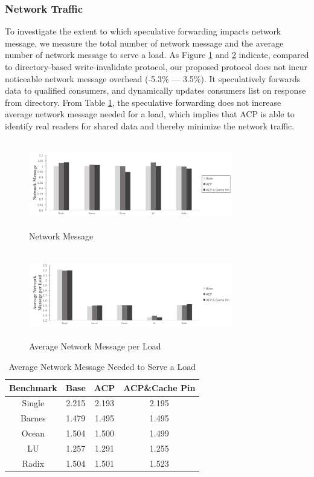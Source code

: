 \documentclass[conference]{IEEEtran}
\begin{document}
\subsubsection{Network Traffic}
To investigate the extent to which speculative forwarding impacts network message, we measure the total number of network message and the average number of network message to serve a load. As Figure \ref{network_msg} and \ref{avg_network_msg_per_load} indicate, compared to directory-based write-invalidate protocol, our proposed protocol does not incur noticeable network message overhead (-5.3\% --- 3.5\%). It speculatively forwards data to qualified consumers, and dynamically updates consumers list on response from directory. From Table \ref{table_msg}, the speculative forwarding does not increase average network message needed for a load, which implies that ACP is able to identify real readers for shared data and thereby minimize the network traffic.

\begin{figure}[!h]
\centering
\captionsetup{justification=centering}
\includegraphics[width=3.5in,height=1.5in]{network_msg.png}
\caption{Network Message}
\label{network_msg}
\end{figure}
\FloatBarrier

\begin{figure}[!h]
\centering
\captionsetup{justification=centering}
\includegraphics[width=3.5in,height=1.5in]{avg_network_msg_per_load.png}
\caption{Average Network Message per Load}
\label{avg_network_msg_per_load}
\end{figure}
\FloatBarrier

\begin{table}[!h]
\renewcommand{\arraystretch}{2.5}
\caption{Average Network Message Needed to Serve a Load}
\label{table_msg}
\centering
\begin{tabular}{|c|c|c|c|}
\hline
Benchmark & Base & ACP & ACP\&Cache Pin\\
\hline
Single & 2.215 & 2.193 & 2.195\\
\hline
Barnes & 1.479 & 1.495 & 1.495\\
\hline
Ocean & 1.504 & 1.500 & 1.499\\
\hline
LU & 1.257 & 1.291 & 1.255\\
\hline
Radix & 1.504 & 1.501 & 1.523\\
\hline
\end{tabular}
\end{table}
\FloatBarrier
\end{document}
